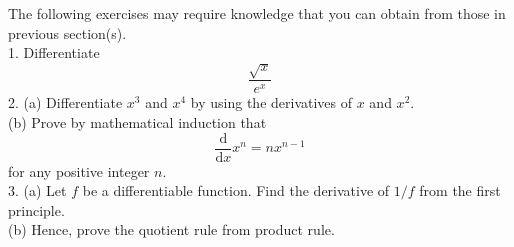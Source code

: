 The following exercises may require knowledge that you can obtain from those in previous section(s).\\
1. Differentiate
$$\frac{\sqrt x}{e^x}$$
2. (a) Differentiate $x^3$ and $x^4$ by using the derivatives of $x$ and $x^2$.\\
(b) Prove by mathematical induction that
$$\frac{\mathrm d}{\mathrm dx}x^n=nx^{n-1}$$
for any positive integer $n$.\\
3. (a) Let $f$ be a differentiable function. Find the derivative of $1/f$ from the first principle.\\
(b) Hence, prove the quotient rule from product rule.